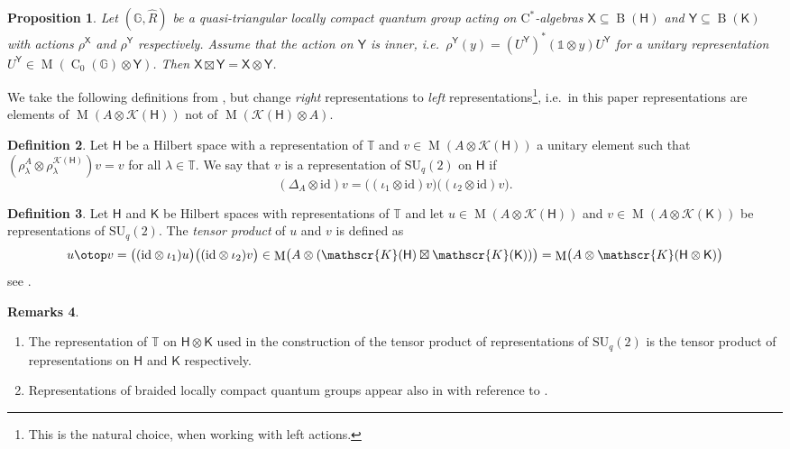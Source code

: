 \documentclass[12pt,reqno,a4paper]{amsart}
\newtheorem{proposition}{Proposition}[section]
\theoremstyle{definition}
\newtheorem{definition}[proposition]{Definition}
\newtheorem{remarks}[proposition]{Remarks}
\newcommand{\cst}{\ensuremath{\mathrm{C}^*}}
\newcommand{\hh}[1]{\widehat{#1}}
\newcommand{\I}{\mathds{1}}
\newcommand{\id}{\mathrm{id}}
\newcommand{\tens}{\otimes}
\newcommand{\GG}{\mathbb{G}}
\newcommand{\TT}{\mathbb{T}}
\newcommand{\cK}{\mathscr{K}}
\newcommand{\sH}{\mathsf{H}}
\newcommand{\sK}{\mathsf{K}}
\newcommand{\sX}{\mathsf{X}}
\newcommand{\sY}{\mathsf{Y}}
\DeclareMathOperator{\B}{B}
\DeclareMathOperator{\C}{C}
\DeclareMathOperator{\M}{M}
\newcommand{\SU}{\mathrm{SU}}
\numberwithin{equation}{section}
\begin{document}
\begin{proposition}
Let $(\GG,\hh{R})$ be a quasi-triangular locally compact quantum group acting on \cst-algebras $\sX\subseteq\B(\sH)$ and $\sY\subseteq\B(\sK)$ with actions $\rho^\sX$ and $\rho^\sY$ respectively. Assume that the action on $\sY$ is inner, i.e.~$\rho^\sY(y)=(U^\sY)^*(\I\tens y)U^\sY$ for a unitary representation $U^\sY\in\M(\C_0(\GG)\tens\sY)$. Then $\sX\boxtimes\sY=\sX\tens\sY$.
\end{proposition}

We take the following definitions from \cite[Section 5]{BraidedSU2}, but change \emph{right} representations to \emph{left} representations\footnote{This is the natural choice, when working with left actions.}, i.e.~in this paper representations are elements of $\M(A\tens\cK(\sH))$ not of $\M(\cK(\sH)\tens A)$.

\begin{definition}\label{def-def1}
Let $\sH$ be a Hilbert space with a representation of $\TT$ and $v\in\M(A\tens\cK(\sH))$ a unitary element such that $(\rho^A_\lambda\tens\rho^{\cK(\sH)}_\lambda)v=v$ for all $\lambda\in\TT$. We say that $v$ is a representation of $\SU_q(2)$ on $\sH$ if
\[
(\Delta_A\tens\id)v=\bigl((\iota_1\tens\id)v\bigr)\bigl((\iota_2\tens\id)v\bigr).
\]
\end{definition}


\begin{definition}
Let $\sH$ and $\sK$ be Hilbert spaces with representations of $\TT$ and let $u\in\M(A\tens\cK(\sH))$ and $v\in\M(A\tens\cK(\sK))$ be representations of $\SU_q(2)$. The \emph{tensor product} of $u$ and $v$ is defined as
\[
u\otop v=
\bigl((\id\tens\iota_1)u\bigr)\bigl((\id\tens\iota_2)v\bigr)
\in\M\bigl(A\tens(\cK(\sH)\boxtimes\cK(\sK))\bigr)
=\M\bigl(A\tens\cK(\sH\tens\sK)\bigr)
\]
see \cite[Proposition 5.3]{BraidedSU2}.
\end{definition}

\begin{remarks}\hspace*{\fill}
\begin{enumerate}
\item The representation of $\TT$ on $\sH\tens\sK$ used in the construction of the tensor product of representations of $\SU_q(2)$ is the tensor product of representations on $\sH$ and $\sK$ respectively.%
\item Representations of braided locally compact quantum groups appear also in \cite[Definition 2.2]{Braidedsymgraph} with reference to \cite{MeyerRoyBraided}.
\end{enumerate}
\end{remarks}
\end{document}
